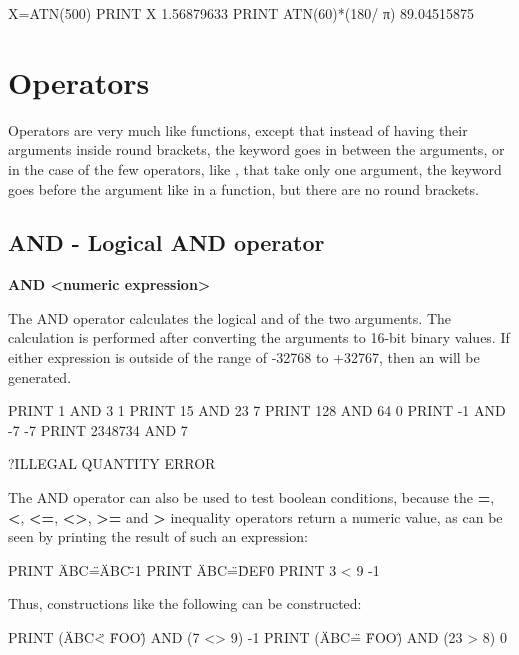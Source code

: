 \begin{screenoutput}
  X=ATN(500)
  PRINT X
  1.56879633
  PRINT ATN(60)*(180/ π)
  89.04515875
\end{screenoutput}

\section{Operators}

Operators are very much like functions, except that instead of having their arguments inside round brackets,
the keyword goes in between the arguments, or in the case of the few operators, like , that take only one argument,
the keyword goes before the argument like in a function, but there are no round brackets.

\subsection{AND - Logical AND operator}

{\bf <numeric expression> AND <numeric expression>}

The AND operator calculates the logical and of the two arguments.
The calculation is performed after converting the arguments to 16-bit binary values.
If either expression is outside of the range of -32768 to +32767, then an  will be generated.

\begin{screenoutput}
  PRINT 1 AND 3
  1
  PRINT 15 AND 23
  7
  PRINT 128 AND 64
  0
  PRINT -1 AND -7
  -7
  PRINT 2348734 AND 7

  ?ILLEGAL QUANTITY ERROR
\end{screenoutput}

The AND operator can also be used to test boolean conditions, because the {\bf =}, {\bf <}, {\bf <=}, {\bf <>}, {\bf >=} and {\bf >} inequality operators return a numeric value, as can be seen by printing the result of such an expression:

\begin{screenoutput}
  PRINT \"ABC\"=\"ABC\"
  -1
  PRINT \"ABC\"=\"DEF\"
  0
  PRINT 3 < 9
  -1
\end{screenoutput}

Thus, constructions like the following can be constructed:

\begin{screenoutput}
  PRINT (\"ABC\" < \"FOO\") AND (7 <> 9)
  -1
  PRINT (\"ABC\" = \"FOO\") AND (23 > 8)
  0
\end{screenoutput}
